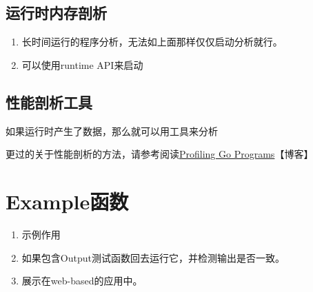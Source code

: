 \hypertarget{ux8fd0ux884cux65f6ux5185ux5b58ux5256ux6790}{%
\subsection{运行时内存剖析}\label{ux8fd0ux884cux65f6ux5185ux5b58ux5256ux6790}}

\begin{enumerate}
\tightlist
\item
  长时间运行的程序分析，无法如上面那样仅仅启动分析就行。
\item
  可以使用runtime API来启动
\end{enumerate}

\hypertarget{ux6027ux80fdux5256ux6790ux5de5ux5177}{%
\subsection{性能剖析工具}\label{ux6027ux80fdux5256ux6790ux5de5ux5177}}

如果运行时产生了数据，那么就可以用工具来分析

\begin{Shaded}
\begin{Highlighting}[]
\end{Highlighting}
\end{Shaded}

更过的关于性能剖析的方法，请参考阅读\href{https://blog.golang.org/profiling-go-programs}{Profiling
Go Programs}【博客】

\hypertarget{exampleux51fdux6570}{%
\section{Example函数}\label{exampleux51fdux6570}}

\begin{Shaded}
\begin{Highlighting}[]
\NormalTok{))}
\NormalTok{))}
\NormalTok{\}}

\end{Highlighting}
\end{Shaded}

\begin{enumerate}
\tightlist
\item
  示例作用
\item
  如果包含Output测试函数回去运行它，并检测输出是否一致。
\item
  展示在web-based的应用中。
\end{enumerate}
